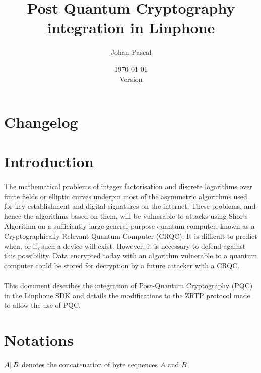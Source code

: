 \documentclass[a4paper,11pt]{article}
\title{Post Quantum Cryptography integration in Linphone}
\date{\today\\Version \currentVersion}
\author{Johan Pascal}
\def\currentVersion{1.1}
\begin{document}
\maketitle
\newpage
\tableofcontents

\newpage
\section{Changelog}
\begin{versionhistory}
\end{versionhistory}

\newpage
\section{Introduction}
\paragraph{}The mathematical problems of integer factorisation and discrete logarithms over finite fields or elliptic curves underpin most of the asymmetric algorithms used for key establishment and digital signatures on the internet.  These problems, and hence the algorithms based on them, will be vulnerable to attacks using Shor's Algorithm on a sufficiently large general-purpose quantum computer, known as a Cryptographically Relevant Quantum Computer (CRQC).  It is difficult to predict when, or if, such a device will exist.  However, it is necessary to defend against this possibility. Data encrypted today with an algorithm vulnerable to a quantum computer could be stored for decryption by a future attacker with a CRQC.\citep{driscoll-pqt-hybrid-terminology-00}

\paragraph{}This document describes the integration of Post-Quantum Cryptography (PQC) in the Linphone SDK and details the modifications to the ZRTP protocol\citep{rfc6189} made to allow the use of PQC.
\section{Notations}
\paragraph{}$A\Arrowvert B$ denotes the concatenation of byte sequences $A$ and $B$
\end{document}
